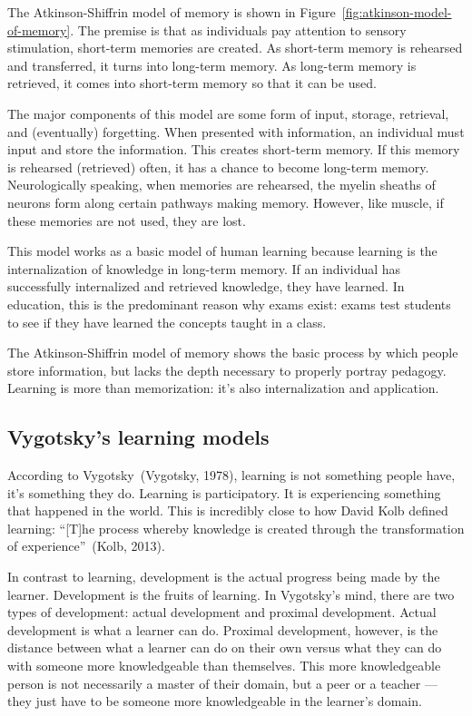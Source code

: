 The Atkinson-Shiffrin model of memory is shown in Figure~\ref{fig:atkinson-model-of-memory}. The premise is that as individuals pay attention to sensory stimulation, short-term memories are created. As short-term memory is rehearsed and transferred, it turns into long-term memory. As long-term memory is retrieved, it comes into short-term memory so that it can be used.

The major components of this model are some form of input, storage, retrieval, and (eventually) forgetting. When presented with information, an individual must input and store the information. This creates short-term memory. If this memory is rehearsed (retrieved) often, it has a chance to become long-term memory. Neurologically speaking, when memories are rehearsed, the myelin sheaths of neurons form along certain pathways making memory. However, like muscle, if these memories are not used, they are lost.

This model works as a basic model of human learning because learning is the internalization of knowledge in long-term memory. If an individual has successfully internalized and retrieved knowledge, they have learned. In education, this is the predominant reason why exams exist: exams test students to see if they have learned the concepts taught in a class.

The Atkinson-Shiffrin model of memory shows the basic process by which people store information, but lacks the depth necessary to properly portray pedagogy. Learning is more than memorization: it's also internalization and application.

\subsection{Vygotsky's learning models}
According to Vygotsky~(Vygotsky, 1978), learning is not something people have, it's something they do. Learning is participatory. It is experiencing something that happened in the world. This is incredibly close to how David Kolb defined learning: ``[T]he process whereby knowledge is created through the transformation of experience''~(Kolb, 2013).

In contrast to learning, development is the actual progress being made by the learner. Development is the fruits of learning. In Vygotsky's mind, there are two types of development: actual development and proximal development. Actual development is what a learner can do. Proximal development, however, is the distance between what a learner can do on their own versus what they can do with someone more knowledgeable than themselves. This more knowledgeable person is not necessarily a master of their domain, but a peer or a teacher — they just have to be someone more knowledgeable in the learner's domain.

